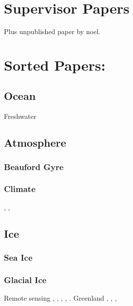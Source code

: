
\section*{Supervisor Papers}
\cite{Moon2018}
\citep{Gourmelen2018}
\citep{Foresta2016}
\citep{Tsamados}
Plus unpublished paper by noel.

\section*{Sorted Papers:}

\subsection*{Ocean}
\cite{Osterhus2019}

Freshwater \cite{Schauer2019}

\subsection*{Atmosphere}
\subsubsection{Beauford Gyre}
\cite{Zhang2016}
\subsubsection{Climate}
\citep{Ades2019}, \cite{Nakamura2016}, \cite{Coumou2018}
\subsection*{Ice}
\subsubsection*{Sea Ice}
\citep{Stroeve2018}
\cite{Kwok2018}
\cite{Guemas2016}
\subsubsection*{Glacial Ice}
Remote sensing \citep{McMillan2018} , \cite{Siegfried2014}, \citep{Moyer2017}, \cite{Simonsen2017}, \cite{Nilsson2016}.
Greenland \citep{Tedstone2015}
\citep{Weissgerber2017}, \cite{Williams2020}, \citep{Igneczi2016}, \citep{Sandberg2018}